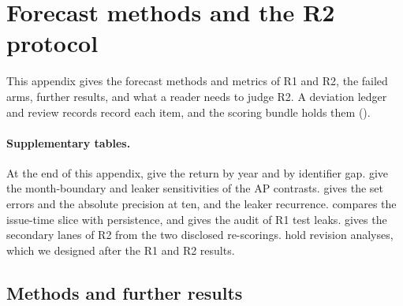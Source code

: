 \section{Forecast methods and the R2 protocol}\label{app:protocol}

This appendix gives the forecast methods and metrics of R1 and R2, the failed arms, further results, and what a reader needs to judge R2.
A deviation ledger and review records record each item, and the scoring bundle holds them ().

\paragraph{Supplementary tables.}\label{app:tables}
At the end of this appendix,  give the return by year and by identifier gap.
 give the month-boundary and leaker sensitivities of the AP contrasts.
 gives the set errors and the absolute precision at ten, and  the leaker recurrence.
 compares the issue-time slice with persistence, and  gives the audit of R1 test leaks.
 gives the secondary lanes of R2 from the two disclosed re-scorings.
 hold revision analyses, which we designed after the R1 and R2 results.

\subsection{Methods and further results}

